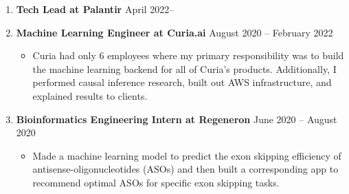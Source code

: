 \documentclass[letterpaper,11pt]{article}
\newcommand{\resitem}[1]{\item #1 \vspace{-2pt}}
\begin{document}
\vspace{-6pt}
\begin{enumerate}[leftmargin=10pt]
	\item[] \textbf{Tech Lead at \textcolor{myGreen}{Palantir}} \cftdotfill{\cftdotsep} April 2022--\\

	\item[] \textbf{Machine Learning Engineer at \textcolor{myGreen}{Curia.ai}} \cftdotfill{\cftdotsep} August 2020 -- February 2022\\
	\vspace{-4pt}	
	\begin{itemize}
		\resitem{Curia had only 6 employees where my primary responsibility was to build the machine learning backend for all of Curia's products. Additionally, I performed causal inference research, built out AWS infrastructure, and explained results to clients.}
	\end{itemize}

	 
	\item[] \textbf{Bioinformatics Engineering Intern at \textcolor{myGreen}{Regeneron}} \cftdotfill{\cftdotsep} June 2020 -- August 2020\\
	\vspace{-4pt}	
	\begin{itemize}
		\resitem{Made a machine learning model to predict the exon skipping efficiency of antisense-oligonucleotides (ASOs) and then built a corresponding app to recommend optimal ASOs for specific exon skipping tasks.}	
	\end{itemize}


\end{enumerate}
\end{document}

